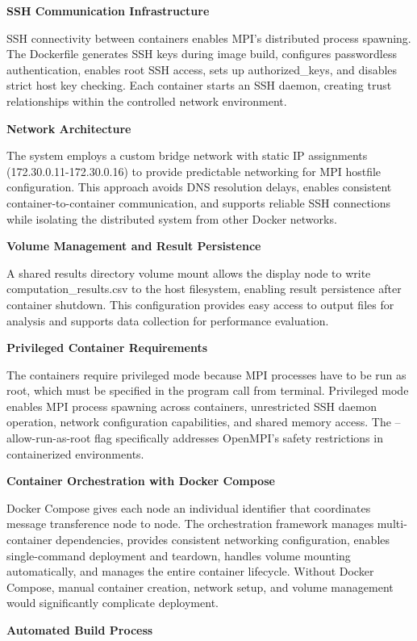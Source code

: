 \documentclass{article}
\begin{document}
\textbf{SSH Communication Infrastructure}

SSH connectivity between containers enables MPI's distributed process spawning. The Dockerfile generates SSH keys during image build, configures passwordless authentication, enables root SSH access, sets up authorized\_keys, and disables strict host key checking. Each container starts an SSH daemon, creating trust relationships within the controlled network environment.

\textbf{Network Architecture}

The system employs a custom bridge network with static IP assignments (172.30.0.11-172.30.0.16) to provide predictable networking for MPI hostfile configuration. This approach avoids DNS resolution delays, enables consistent container-to-container communication, and supports reliable SSH connections while isolating the distributed system from other Docker networks.

\textbf{Volume Management and Result Persistence}

A shared results directory volume mount allows the display node to write computation\_results.csv to the host filesystem, enabling result persistence after container shutdown. This configuration provides easy access to output files for analysis and supports data collection for performance evaluation.

\textbf{Privileged Container Requirements}

The containers require privileged mode because MPI processes have to be run as root, which must be specified in the program call from terminal. Privileged mode enables MPI process spawning across containers, unrestricted SSH daemon operation, network configuration capabilities, and shared memory access. The --allow-run-as-root flag specifically addresses OpenMPI's safety restrictions in containerized environments.

\textbf{Container Orchestration with Docker Compose}

Docker Compose gives each node an individual identifier that coordinates message transference node to node. The orchestration framework manages multi-container dependencies, provides consistent networking configuration, enables single-command deployment and teardown, handles volume mounting automatically, and manages the entire container lifecycle. Without Docker Compose, manual container creation, network setup, and volume management would significantly complicate deployment.

\textbf{Automated Build Process}
\end{document}
